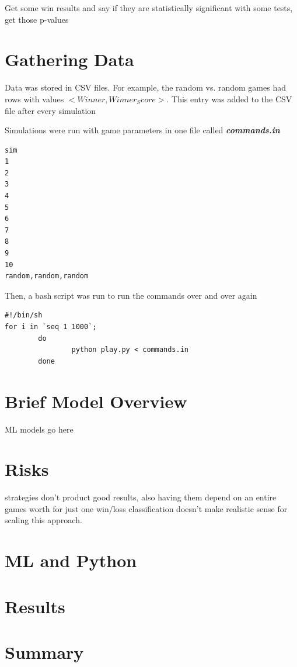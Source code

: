 \documentclass[11pt, oneside]{article}   	%
\begin{document}
Get some win results and say if they are statistically significant with some tests, get those p-values

\section{Gathering Data}

Data was stored in CSV files. For example, the random vs. random games had rows with values  $<Winner, Winner_Score>$. This entry was added to the CSV file after every simulation

Simulations were run with game parameters in one file called \textbf{\textit{commands.in}}

\begin{verbatim}
sim
1
2
3
4
5
6
7
8
9
10
random,random,random
\end{verbatim}

Then, a bash script was run to run the commands over and over again

\begin{verbatim}
#!/bin/sh
for i in `seq 1 1000`;
        do
                python play.py < commands.in
        done
\end{verbatim}


\section{Brief Model Overview}

ML models go here

\section{Risks}

strategies don't product good results, also having them depend on an entire games worth for just one win/loss classification doesn't make realistic sense for scaling this approach. 

\section{ML and Python}

\section{Results}

\section{Summary}
\end{document}
